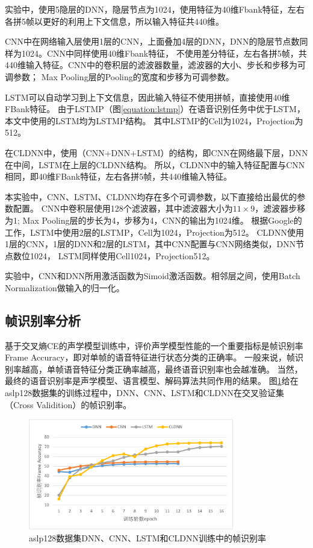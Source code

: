 实验中，使用5隐层的DNN，隐层节点为1024，使用特征为40维Fbank特征，左右各拼5帧以更好的利用上下文信息，所以输入特征共440维。

CNN中在网络输入层使用1层的CNN，上面叠加4层的DNN，DNN的隐层节点数同样为1024。CNN中同样使用40维Fbank特征，
不使用差分特征，左右各拼5帧，共440维输入特征。CNN中的卷积层的滤波器数量，滤波器的大小、步长和步移为可调参数；
Max Pooling层的Pooling的宽度和步移为可调参数。

LSTM可以自动学习到上下文信息，因此输入特征不使用拼帧，直接使用40维FBank特征。
由于LSTMP（图\ref{equation:lstmp}）在语音识别任务中优于LSTM，本文中使用的LSTM均为LSTMP结构。
其中LSTMP的Cell为1024，Projection为512。

在CLDNN中，使用（CNN+DNN+LSTM）的结构，即CNN在网络最下层，DNN在中间，LSTM在上层的CLDNN结构。
所以，CLDNN中的输入特征配置与CNN相同，即40维FBank特征，左右各拼5帧，共440维输入特征。

本实验中，CNN、LSTM、CLDNN均存在多个可调参数，以下直接给出最优的参数配置。
CNN中卷积层使用128个滤波器，其中滤波器大小为$11 \times 9$，滤波器步移为1;
Max Pooling层的步长为4，步移为4，CNN的输出为1024维。
根据Google的工作，LSTM中使用2层的LSTMP，Cell为1024，Projection为512。
CLDNN使用1层的CNN，1层的DNN和2层的LSTM，其中CNN配置与CNN网络类似，DNN节点数位1024，
LSTM同样使用Cell1024，Projection512。

实验中，CNN和DNN所用激活函数为Simoid激活函数。相邻层之间，使用Batch Normalization做输入的归一化。

\subsection{帧识别率分析}

基于交叉熵CE的声学模型训练中，评价声学模型性能的一个重要指标是帧识别率Frame Accuracy，即对单帧的语音特征进行状态分类的正确率。
一般来说，帧识别率越高，单帧语音特征分类正确率越高，最终语音识别率也会越准确。
当然，最终的语音识别率是声学模型、语言模型、解码算法共同作用的结果。
图\ref{fig:acc}给在aslp128数据集的训练过程中，DNN、CNN、LSTM和CLDNN在交叉验证集（Cross Validition）的帧识别率。

\begin{figure}[htbp]
\centering
\includegraphics[width=0.8\textwidth]{figures/chapter3/acc-crop}
\caption{aslp128数据集DNN、CNN、LSTM和CLDNN训练中的帧识别率}
\label{fig:acc}
\end{figure}

